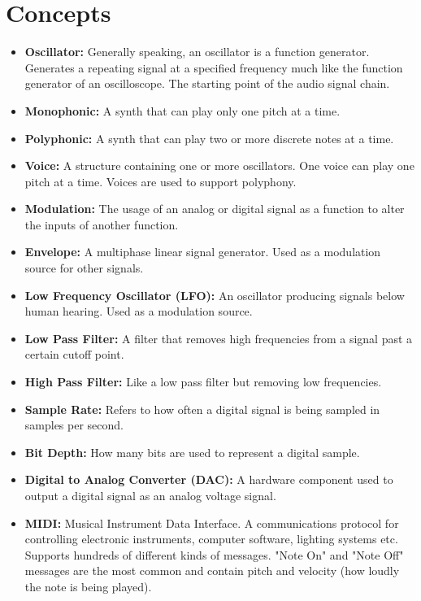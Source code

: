 \documentclass[acmlarge,screen]{acmart}
\begin{document}
\section{Concepts}
	\begin{itemize}
		\item \textbf{Oscillator:} Generally speaking, an oscillator is a function generator. Generates a repeating signal at a specified frequency much like the function generator of an oscilloscope. The starting point of the audio signal chain.
		\item \textbf{Monophonic:} A synth that can play only one pitch at a time.
		\item \textbf{Polyphonic:} A synth that can play two or more discrete notes at a time.
		\item \textbf{Voice:} A structure containing one or more oscillators. One voice can play one pitch at a time. Voices are used to support polyphony.
		\item \textbf{Modulation:} The usage of an analog or digital signal as a function to alter the inputs of another function.
		\item \textbf{Envelope:} A multiphase linear signal generator. Used as a modulation source for other signals.
		\item \textbf{Low Frequency Oscillator (LFO):} An oscillator producing signals below human hearing. Used as a modulation source.
		\item \textbf{Low Pass Filter:} A filter that removes high frequencies from a signal past a certain cutoff point.
		\item \textbf{High Pass Filter:} Like a low pass filter but removing low frequencies.
		\item \textbf{Sample Rate:} Refers to how often a digital signal is being sampled in samples per second.
		\item \textbf{Bit Depth:} How many bits are used to represent a digital sample.
		\item \textbf{Digital to Analog Converter (DAC):} A hardware component used to output a digital signal as an analog voltage signal.
		\item \textbf{MIDI:} Musical Instrument Data Interface. A communications protocol for controlling electronic instruments, computer software, lighting systems etc. Supports hundreds of different kinds of messages. "Note On" and "Note Off" messages are the most common and contain pitch and velocity (how loudly the note is being played).
		
		
	\end{itemize}
\end{document}
